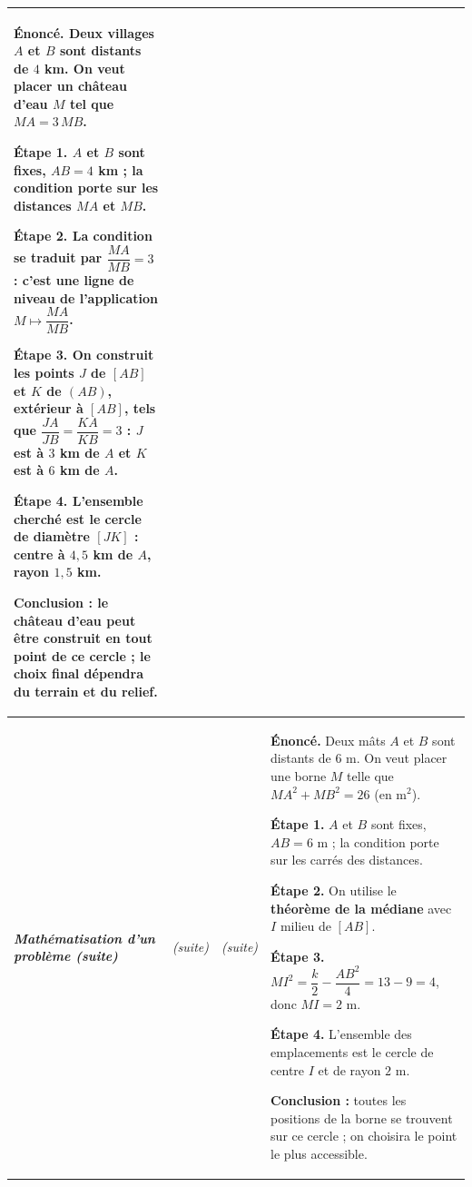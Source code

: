 \documentclass[10pt,a4paper,landscape]{article}
\newcommand{\moment}[1]{\textbf{\itshape #1}}                             %
\begin{document}
{\begin{longtable}{|J{2.12cm}|L{5.17cm}|L{4.37cm}|L{13.64cm}|}
\textbf{Énoncé.} Deux villages $A$ et $B$ sont distants de $4$ km. On veut placer un château d'eau $M$ tel que $MA=3\,MB$.\par
\textbf{Étape 1.} $A$ et $B$ sont fixes, $AB=4$ km ; la condition porte sur les distances $MA$ et $MB$.\par
\textbf{Étape 2.} La condition se traduit par $\dfrac{MA}{MB}=3$ : c'est une \textbf{ligne de niveau} de
l'application $M\mapsto\dfrac{MA}{MB}$.\par
\textbf{Étape 3.} On construit les points $J$ de $[AB]$ et $K$ de $(AB)$, extérieur à $[AB]$, tels que
$\dfrac{JA}{JB}=\dfrac{KA}{KB}=3$ : $J$ est à $3$ km de $A$ et $K$ est à $6$ km de $A$.\par
\textbf{Étape 4.} L'ensemble cherché est le cercle de diamètre $[JK]$ : centre à $4{,}5$ km de $A$, rayon $1{,}5$ km.\par
\textbf{Conclusion :} le château d'eau peut être construit en tout point de ce cercle ; le choix final dépendra
du terrain et du relief.

\par{}\par\nobreak
\\
\hline
\moment{Ma\-thé\-ma\-ti\-sa\-tion d'un problème (suite)} &
\par{\centering\itshape (suite)\par} &
\par{\centering\itshape (suite)\par} &

\textbf{Énoncé.} Deux mâts $A$ et $B$ sont distants de $6$ m. On veut placer une borne $M$ telle que
$MA^2+MB^2=26$ (en m$^2$).\par
\textbf{Étape 1.} $A$ et $B$ sont fixes, $AB=6$ m ; la condition porte sur les carrés des distances.\par
\textbf{Étape 2.} On utilise le \textbf{théorème de la médiane} avec $I$ milieu de $[AB]$.\par
\textbf{Étape 3.} $MI^2=\dfrac{k}{2}-\dfrac{AB^2}{4}=13-9=4$, donc $MI=2$ m.\par
\textbf{Étape 4.} L'ensemble des emplacements est le cercle de centre $I$ et de rayon $2$ m.\par
\textbf{Conclusion :} toutes les positions de la borne se trouvent sur ce cercle ; on choisira le point le plus accessible.

\par{}\par\nobreak


\end{longtable}}
\end{document}
